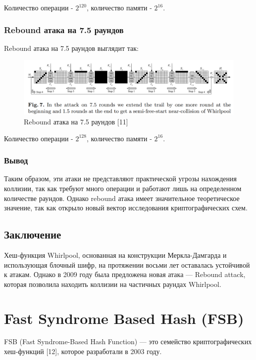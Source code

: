 \documentclass[colorthm]{./civarticle}
\begin{document}
Количество операции - $2^{120}$, количество памяти - $2^{16}$.

\subsubsection{Rebound атака на 7.5 раундов}

Rebound атака на 7.5 раундов выглядит так:

\begin{figure}[H]
    \centering
    \includegraphics[width=0.75\linewidth]{att_3.png}
    \caption{Rebound атака на 7.5 раундов [11]}
    \label{fig:enter-label}
\end{figure}

Количество операции - $2^{128}$, количество памяти - $2^{16}$.

\subsubsection{Вывод}

Таким образом, эти атаки не представляют практической угрозы нахождения коллизии, так как требуют много операции и работают лишь на определенном количестве раундов. Однако rebound атака имеет значительное теоретическое значение, так как открыло новый вектор исследования криптографических схем.

\subsection{Заключение}

Хеш-функция Whirlpool, основанная на конструкции Меркла-Дамгарда и использующая блочный шифр, на протяжении восьми лет оставалась устойчивой к атакам. Однако в 2009 году была предложена новая атака — Rebound attack, которая позволила находить коллизии на частичных раундах Whirlpool.


\section{Fast Syndrome Based Hash (FSB)}
FSB (Fast Syndrome-Based Hash Function) — это семейство криптографических хеш-функций [12], которое разработали в 2003 году.
\end{document}
